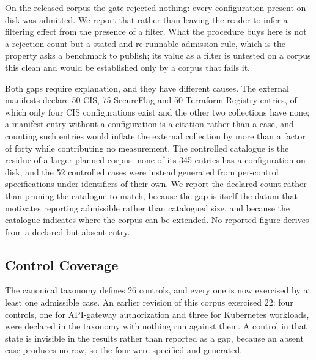 \documentclass[smallextended]{svjour3}
\begin{document}
On the released corpus the gate rejected nothing: every configuration present on
disk was admitted. We report that rather than leaving the reader to infer a
filtering effect from the presence of a filter. What the procedure buys here is
not a rejection count but a stated and re-runnable admission rule, which is the
property \citet{hasselbring2021benchmarking} asks a benchmark to publish; its
value as a filter is untested on a corpus this clean and would be established
only by a corpus that fails it.

Both gaps require explanation, and they have different causes. The external
manifests declare 50 CIS, 75 SecureFlag and 50 Terraform Registry entries, of
which only four CIS configurations exist and the other two collections have none; a manifest entry
without a configuration is a citation rather than a case, and counting such
entries would inflate the external collection by more than a factor of forty
while contributing no measurement. The controlled catalogue is the residue of a
larger planned corpus: none of its 345 entries has a configuration on disk, and
the 52 controlled cases were instead generated from per-control specifications
under identifiers of their own. We
report the declared count rather than pruning the catalogue to match, because the
gap is itself the datum that motivates reporting admissible rather than
catalogued size, and because the catalogue indicates where the corpus can be
extended. No reported figure derives from a declared-but-absent entry.

\subsection{Control Coverage}
\label{sec:coverage}
The canonical taxonomy defines 26 controls, and every one is now exercised by at
least one admissible case. An earlier revision of this corpus exercised 22: four
controls, one for API-gateway authorization and three for Kubernetes workloads,
were declared in the taxonomy with nothing run against them. A control in that
state is invisible in the results rather than reported as a gap, because an absent
case produces no row, so the four were specified and generated.
\end{document}
